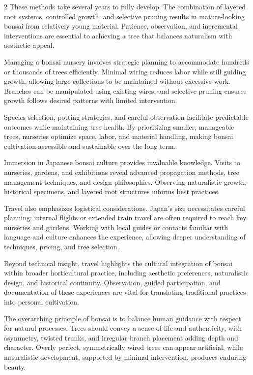 \begin{multicols}{2}
These methods take several years to fully develop. The combination of layered root systems, controlled growth, and selective pruning results in mature-looking bonsai from relatively young material. Patience, observation, and incremental interventions are essential to achieving a tree that balances naturalism with aesthetic appeal.

\medskip
{}
\noindent
Managing a bonsai nursery involves strategic planning to accommodate hundreds or thousands of trees efficiently. Minimal wiring reduces labor while still guiding growth, allowing large collections to be maintained without excessive work. Branches can be manipulated using existing wires, and selective pruning ensures growth follows desired patterns with limited intervention.  

Species selection, potting strategies, and careful observation facilitate predictable outcomes while maintaining tree health. By prioritizing smaller, manageable trees, nurseries optimize space, labor, and material handling, making bonsai cultivation accessible and sustainable over the long term.

\medskip
{}
\noindent
Immersion in Japanese bonsai culture provides invaluable knowledge. Visits to nurseries, gardens, and exhibitions reveal advanced propagation methods, tree management techniques, and design philosophies. Observing naturalistic growth, historical specimens, and layered root structures informs best practices.  

Travel also emphasizes logistical considerations. Japan’s size necessitates careful planning; internal flights or extended train travel are often required to reach key nurseries and gardens. Working with local guides or contacts familiar with language and culture enhances the experience, allowing deeper understanding of techniques, pricing, and tree selection.  

Beyond technical insight, travel highlights the cultural integration of bonsai within broader horticultural practice, including aesthetic preferences, naturalistic design, and historical continuity. Observation, guided participation, and documentation of these experiences are vital for translating traditional practices into personal cultivation.

\medskip
{}
\noindent
The overarching principle of bonsai is to balance human guidance with respect for natural processes. Trees should convey a sense of life and authenticity, with asymmetry, twisted trunks, and irregular branch placement adding depth and character. Overly perfect, symmetrically wired trees can appear artificial, while naturalistic development, supported by minimal intervention, produces enduring beauty.  


\end{multicols}
